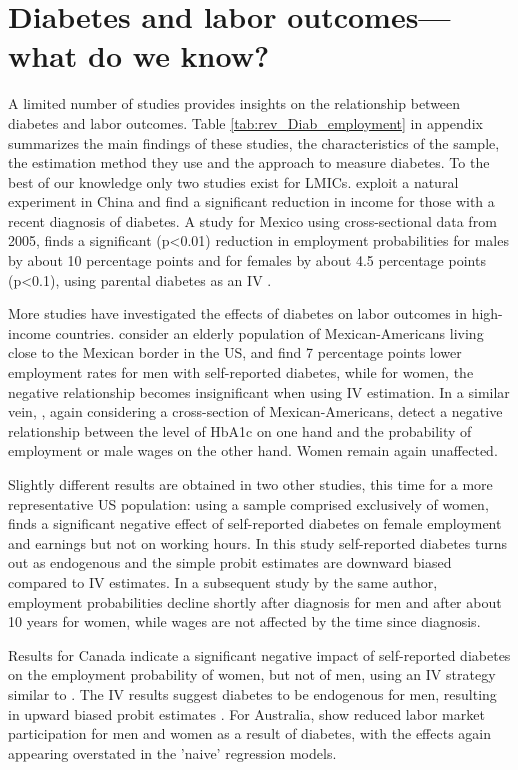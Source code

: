 \documentclass[12pt,english]{article}
\begin{document}
\section{\label{sec:labor  outcomes and diabetes literature}Diabetes and labor outcomes---what do we know?}

A limited number of studies provides insights on the relationship between diabetes and labor outcomes.  Table \ref{tab:rev_Diab_employment} in appendix summarizes the main findings of these studies, the characteristics of the sample, the estimation method they use and the approach to measure diabetes.  To the best of our knowledge only two studies exist for \acp{LMIC}. \textcite{Liu2014} exploit a natural experiment in China and find a significant reduction in income for those with a recent diagnosis of diabetes. A study for Mexico using cross-sectional data from 2005, finds a significant (p<0.01) reduction in employment probabilities for males by about 10 percentage points and for females by about 4.5 percentage points (p<0.1), using parental diabetes as an \ac{IV} \parencite{Seuring2015}.

More studies have investigated the effects of diabetes on labor outcomes in high-income countries. \textcite{Brown2005} consider an elderly population of Mexican-Americans living close to the Mexican border in the US, and find 7 percentage points lower employment rates for men with self-reported diabetes, while for women, the negative relationship becomes insignificant when using \ac{IV} estimation.  In a similar vein, \textcite{BrownIII2011}, again considering a cross-section of Mexican-Americans, detect a negative  relationship between the level of \ac{HbA1c} on one hand and the probability of employment or male wages on the other hand. Women remain again unaffected.  

Slightly different results are obtained in two other studies, this time for a more representative US population: using a sample comprised exclusively of women, \textcite{Minor2011} finds a significant negative effect of self-reported diabetes on female employment and earnings but not on working hours. In this study self-reported diabetes turns out as endogenous and the simple probit estimates are downward biased compared to \ac{IV} estimates. In a subsequent study by the same author, employment probabilities decline shortly after diagnosis for men and after about 10 years for women, while wages are not affected by the time since diagnosis.

Results for Canada indicate a significant negative impact of self-reported diabetes on the employment probability of women, but not of men, using an IV strategy similar to \textcite{Brown2005}. The \ac{IV} results suggest diabetes to be  endogenous for men, resulting in upward biased probit estimates \parencite{Latif2009}. For Australia, \parencite{Zhang2009} show  reduced labor market participation for men and women as a result of diabetes, with the effects again appearing overstated in the 'naive' regression models.
\end{document}
